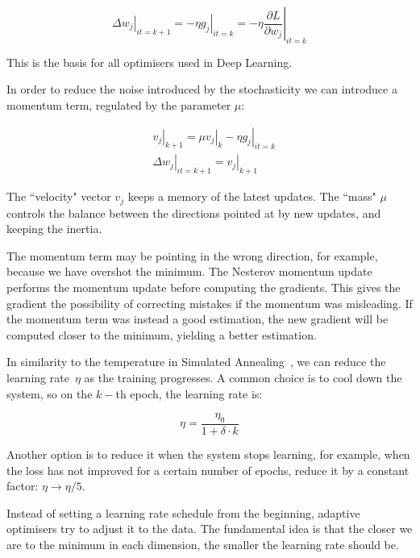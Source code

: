 \begin{equation*}
\left.\Delta w_j\right|_{it=k+1} = - \left.\eta g_j\right|_{it=k} = - \eta \left.\frac{\partial L}{\partial w_j}\right|_{it=k}
\end{equation*}

This is the basis for all optimisers used in Deep Learning.


In order to reduce the noise introduced by the stochasticity we can introduce a momentum term, regulated by the parameter $\mu$:

\begin{align*}
&\left.v_j\right|_{k+1} = \mu \left. v_j\right|_{k} - \left.\eta g_j\right|_{it=k}\\
&\left.\Delta w_j\right|_{it=k+1} = \left.v_j\right|_{k+1}
\end{align*}

The ``velocity" vector $v_j$ keeps a memory of the latest updates.
The ``mass" $\mu$ controls the balance between the directions pointed at by new updates, and keeping the inertia.

The momentum term 
may be pointing in the wrong direction, for example, because we have overshot the minimum.
The Nesterov momentum update~\citep{nag} performs the momentum update before computing the gradients.
This gives the gradient the possibility of correcting mistakes if the momentum was misleading.
If the momentum term was instead a good estimation, the new gradient will be computed closer to the minimum, yielding a better estimation.

In similarity 
to the temperature in Simulated Annealing~\citep{genSA}, we can reduce the learning rate~$\eta$ as the training progresses.
A common choice is to cool down the system, so on the $k-$th epoch, the learning rate is:

\begin{equation}
\eta= \frac{\eta_0}{1 + \delta \cdot k}
\end{equation}

Another option is to reduce it when the system stops learning, for example, when the loss has not improved for a certain number of epochs, reduce it by a constant factor: $\eta \rightarrow \eta/5$.

Instead of setting a learning rate schedule from the beginning, adaptive optimisers try to adjust it to the data.
The fundamental idea is that the closer we are to the minimum in each dimension, the smaller the learning rate should be.

